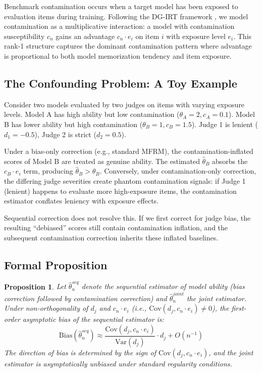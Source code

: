 \documentclass[11pt]{article}
\newtheorem{proposition}{Proposition}
\begin{document}
Benchmark contamination occurs when a target model has been exposed to evaluation items during training. Following the DG-IRT framework \citep{dgirt2024}, we model contamination as a multiplicative interaction: a model with contamination susceptibility $c_n$ gains an advantage $c_n \cdot e_i$ on item $i$ with exposure level $e_i$. This rank-1 structure captures the dominant contamination pattern where advantage is proportional to both model memorization tendency and item exposure.

\subsection{The Confounding Problem: A Toy Example}
\label{sec:toy}

Consider two models evaluated by two judges on items with varying exposure levels. Model A has high ability but low contamination ($\theta_A = 2, c_A = 0.1$). Model B has lower ability but high contamination ($\theta_B = 1, c_B = 1.5$). Judge 1 is lenient ($d_1 = -0.5$), Judge 2 is strict ($d_2 = 0.5$).

Under a bias-only correction (e.g., standard MFRM), the contamination-inflated scores of Model B are treated as genuine ability. The estimated $\hat{\theta}_B$ absorbs the $c_B \cdot e_i$ term, producing $\hat{\theta}_B > \theta_B$. Conversely, under contamination-only correction, the differing judge severities create phantom contamination signals: if Judge 1 (lenient) happens to evaluate more high-exposure items, the contamination estimator conflates leniency with exposure effects.

Sequential correction does not resolve this. If we first correct for judge bias, the resulting ``debiased'' scores still contain contamination inflation, and the subsequent contamination correction inherits these inflated baselines.

\subsection{Formal Proposition}
\label{sec:proposition}

\begin{proposition}
\label{prop:bias}
Let $\hat{\theta}^{seq}_n$ denote the sequential estimator of model ability (bias correction followed by contamination correction) and $\hat{\theta}^{joint}_n$ the joint estimator. Under non-orthogonality of $d_j$ and $c_n \cdot e_i$ (i.e., $\text{Cov}(d_j, c_n \cdot e_i) \neq 0$), the first-order asymptotic bias of the sequential estimator is:
\[
\text{Bias}(\hat{\theta}^{seq}_n) \approx \frac{\text{Cov}(d_j, c_n \cdot e_i)}{\text{Var}(d_j)} \cdot d_j + O(n^{-1})
\]
The direction of bias is determined by the sign of $\text{Cov}(d_j, c_n \cdot e_i)$, and the joint estimator is asymptotically unbiased under standard regularity conditions.
\end{proposition}
\end{document}
